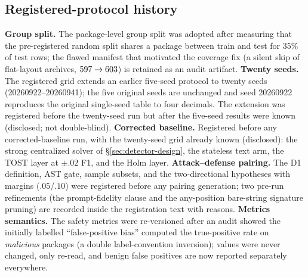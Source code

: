 \documentclass[sigconf,nonacm]{acmart}
\begin{document}
\subsection{Registered-protocol history}
\textbf{Group split.} The package-level group split was adopted after
measuring that the pre-registered random split shares a package between
train and test for $35\%$ of test rows; the flawed manifest that motivated
the coverage fix (a silent skip of flat-layout archives,
$597\to603$) is retained as an audit artifact.
\textbf{Twenty seeds.} The registered grid extends an earlier five-seed
protocol to twenty seeds (20260922--20260941); the five original seeds are
unchanged and seed 20260922 reproduces the original single-seed table to
four decimals. The extension was registered before the twenty-seed run
but after the five-seed results were known (disclosed; not double-blind).
\textbf{Corrected baseline.} Registered before any corrected-baseline
run, with the twenty-seed grid already known (disclosed): the strong
centralized solver of \S\ref{sec:detector-design}, the stateless text
arm, the TOST layer at $\pm.02$ F1, and the Holm layer.
\textbf{Attack--defense pairing.} The D1 definition, AST gate, sample
subsets, and the two-directional hypotheses with margins ($.05$/$.10$)
were registered before any pairing generation; two pre-run refinements
(the prompt-fidelity clause and the any-position bare-string signature
pruning) are recorded inside the registration text with reasons.
\textbf{Metrics semantics.} The safety metrics were re-versioned after an
audit showed the initially labelled ``false-positive bias'' computed the
true-positive rate on \emph{malicious} packages (a double label-convention
inversion); values were never changed, only re-read, and benign false
positives are now reported separately everywhere.
\end{document}
